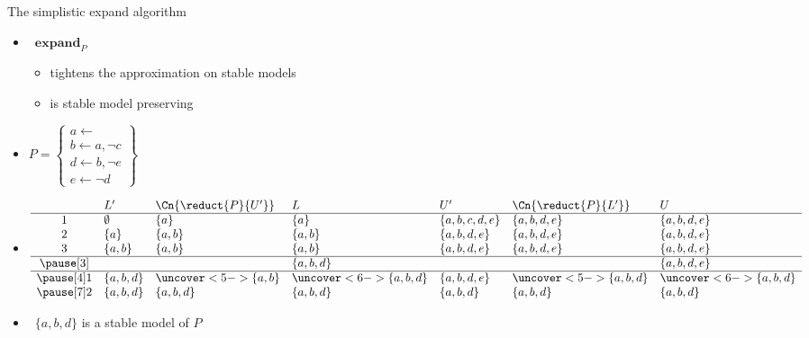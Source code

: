 \begin{frame}{The simplistic expand algorithm}
  \bigskip
  \begin{itemize}
  \item {} \ $\mathbf{expand}_{P}$
    \smallskip
    \begin{itemize}\normalsize
  \item tightens the approximation on stable models
    \smallskip
  \item is stable model preserving
  \end{itemize}
\end{itemize}
\end{frame}
\begin{frame}{}
  \begin{itemize}
  \item<1->[]
    \(
      P
      =
      \left\{
        \begin{array}{l}
          a\leftarrow\\  b\leftarrow a,\neg c\\ d\leftarrow b,\neg e\\ e\leftarrow\neg d
        \end{array}
      \right\}
    \)
  \item<2->[]\small
    \[
      \begin{array}{cllllll}
         & L'       & \Cn{\reduct{P}{U'}}   & L                     & U'            & \Cn{\reduct{P}{L'}}     & U                       \\
        \hline
        1& \emptyset&{\{a  \}}              &            {\{a    \}}& \{a,b,c,d,e\} &            {\{a,b,d,e\}}&            {\{a,b,d,e\}}\\
        2& \{a  \}  &{\{a,b\}}              &            {\{a,b  \}}& \{a,b,  d,e\} &            {\{a,b,d,e\}}&            {\{a,b,d,e\}}\\
        3& \{a,b\}  &{\{a,b\}}              &            {\{a,b  \}}& \{a,b,  d,e\} &            {\{a,b,d,e\}}&            {\{a,b,d,e\}}\\
        \hline\pause[3]
         &          &                       &            {\{a,b,d\}}&               &                         &            {\{a,b,d,e\}}\\
        \hline\pause[4]
        1& \{a,b,d\}&\uncover<5->{\{a,b  \}}&\uncover<6->{\{a,b,d\}}& \{a,b,d,e\}   &\uncover<5->{\{a,b,d  \}}&\uncover<6->{\{a,b,d  \}}\\\pause[7]
        2& \{a,b,d\}&             \{a,b,d\} &             \{a,b,d\} & \{a,b,d\}     &             \{a,b,d  \} &             \{a,b,d  \}
      \end{array}
    \]
    \medskip
  \item<8->  \ $\{a,b,d\}$ is a stable model of $P$
  \end{itemize}
\end{frame}
